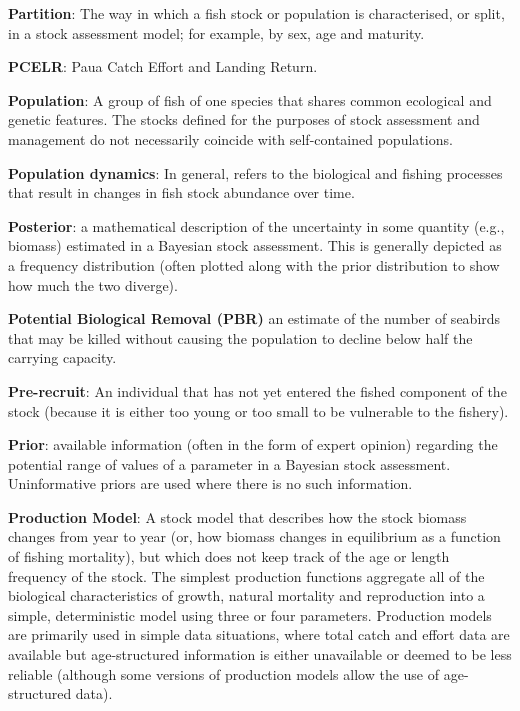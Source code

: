 \documentclass{mpi-plenary}
\theoremstyle{definition}
\theoremstyle{definition}
\theoremstyle{definition}
\theoremstyle{remark}
\begin{document}
\protect\hypertarget{def-partition}{}{} \textbf{Partition}: The way in
which a fish stock or population is characterised, or split, in a stock
assessment model; for example, by sex, age and maturity.

\protect\hypertarget{def-pcelr}{}{} \textbf{PCELR}: Paua Catch Effort
and Landing Return.

\protect\hypertarget{def-population}{}{} \textbf{Population}: A group of
fish of one species that shares common ecological and genetic features.
The stocks defined for the purposes of stock assessment and management
do not necessarily coincide with self-contained populations.

\protect\hypertarget{def-population-dynamics}{}{} \textbf{Population
dynamics}: In general, refers to the biological and fishing processes
that result in changes in fish stock abundance over time.

\protect\hypertarget{def-posterior}{}{} \textbf{Posterior}: a
mathematical description of the uncertainty in some quantity (e.g.,
biomass) estimated in a Bayesian stock assessment. This is generally
depicted as a frequency distribution (often plotted along with the prior
distribution to show how much the two diverge).

\textbf{Potential Biological Removal (PBR)} an estimate of the number of
seabirds that may be killed without causing the population to decline
below half the carrying capacity.

\protect\hypertarget{def-pre-recruit}{}{} \textbf{Pre-recruit}: An
individual that has not yet entered the fished component of the stock
(because it is either too young or too small to be vulnerable to the
fishery).

\protect\hypertarget{def-prior}{}{} \textbf{Prior}: available
information (often in the form of expert opinion) regarding the
potential range of values of a parameter in a Bayesian stock assessment.
Uninformative priors are used where there is no such information.

\protect\hypertarget{def-production-model}{}{} \textbf{Production
Model}: A stock model that describes how the stock biomass changes from
year to year (or, how biomass changes in equilibrium as a function of
fishing mortality), but which does not keep track of the age or length
frequency of the stock. The simplest production functions aggregate all
of the biological characteristics of growth, natural mortality and
reproduction into a simple, deterministic model using three or four
parameters. Production models are primarily used in simple data
situations, where total catch and effort data are available but
age-structured information is either unavailable or deemed to be less
reliable (although some versions of production models allow the use of
age-structured data).
\end{document}

